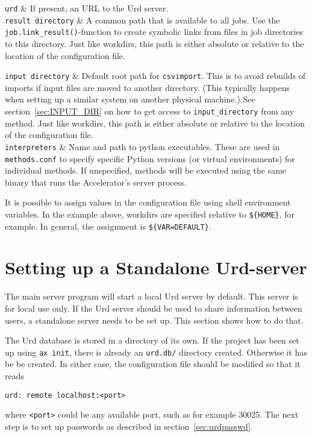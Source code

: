 \RPtwo \texttt{urd} & If present, an URL to the Urd server.\\[1ex]

\RPtwo \texttt{result directory} & A common path that is available to
all jobs.  Use the \texttt{job.link\_result()}-function to create
symbolic links from files in job directories to this directory.  Just
like workdirs, this path is either absolute or relative to the
location of the configuration file.  \\[1ex]

\pagebreak

\RPtwo \texttt{input directory} & Default root path for
\texttt{csvimport}.  This is to avoid rebuilds of imports if input
files are moved to another directory.  (This typically happens when
setting up a similar system on another physical machine.)  See
section~\ref{sec:INPUT_DIR} on how to get access to
\texttt{input\_directory} from any method.  Just like workdirs, this
path is either absolute or relative to the location of the
configuration file.  \\[1ex]

\RPtwo \texttt{interpreters} & Name and path to python executables.
These are used in \texttt{methods.conf} to specify specific Python
versions (or virtual environments) for individual methods.  If
unspecified, methods will be executed using the same binary that runs
the Accelerator's server process.\\[1ex]

\stoptabletwo

It is possible to assign values in the configuration file using shell
environment variables.  In the example above, workdirs are specified
relative to \texttt{\$\{HOME\}}, for example.  In general, the
assignment is \texttt{\$\{VAR=DEFAULT\}}.



\section{Setting up a Standalone Urd-server}
\label{sec:urd_setup}
The main server program will start a local Urd server by default.
This server is for local use only.  If the Urd server should be used
to share information between users, a standalone server needs to be
set up.  This section shows how to do that.

The Urd database is stored in a directory of its own.  If the project
has been set up using \texttt{ax init}, there is already an
\texttt{urd.db/} directory created.  Otherwise it has be be created.
In either case, the configuration file should be modified so that it reads
\begin{verbatim}
urd: remote localhost:<port>
\end{verbatim}
where \texttt{<port>} could be any available port, such as for example
30025.  The next step is to set up passwords as described in section~\ref{sec:urdpasswd}.



